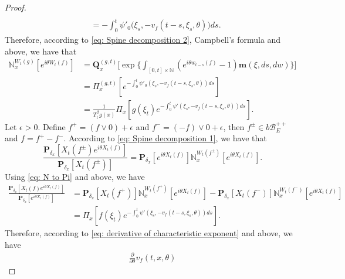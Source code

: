 \documentclass[12pt, a4paper]{amsart}
\theoremstyle{definition}
\numberwithin{equation}{section}
\begin{document}
\begin{proof}
\begin{align}
    \\&= -\int_0^t \psi'_0 \big(\xi_s, -v_f(t-s,\xi_s,\theta)\big)ds.
\end{align}
	Therefore, according to \eqref{eq: Spine decomposition 2}, Campbell's formula and above, we have that
\begin{align}
\label{eq: N to Pi}
	\mathbb N_x^{W_t(g)}[e^{i\theta W_t(f)}]
	&=\mathbf Q_x^{(g,t)} \Big[\exp\Big\{\int_{[0,t]\times \mathbb N}(e^{i\theta w_{t-s}(f)} - 1) \mathbf m(\xi, ds,dw)\Big\}\Big]
    \\&= \Pi_x^{(g,t)} [e^{-\int_0^t \psi'_0(\xi_s, -v_f(t-s,\xi_s,\theta))ds}]
    \\&= \frac{1}{T_t^\beta g (x)} \Pi_x[ g(\xi_t) e^{-\int_0^t \psi'(\xi_s, -v_f(t-s,\xi_s,\theta))ds} ].
\end{align}
    Let $\epsilon >0$.
    Define $f^+ = (f \vee 0) + \epsilon$ and $f^- = (-f) \vee 0 + \epsilon$, then $f^\pm \in b\mathscr B^{++}_E$ and $f = f^+ - f^-$.
    According to \eqref{eq: Spine decomposition 1}, we have that
\begin{equation}
    \frac{\mathbf P_{\delta_x}[X_t(f^{\pm})e^{i\theta X_t(f)}]}{\mathbf P_{\delta_x}[X_t(f^{\pm})]}
    = \mathbf P_{\delta_x}[e^{i\theta X_t(f)}] \mathbb N_x^{W_t(f^{\pm})}[e^{i\theta X_t(f)}].
\end{equation}
    Using \eqref{eq: N to Pi} and above, we have
\begin{align}
	\frac{\mathbf P_{\delta_x}[X_t(f)e^{i\theta X_t(f)}] }{\mathbf P_{\delta_x}[e^{i\theta X_t(f)}]}
	&= \mathbf P_{\delta_x}[X_t(f^+)] \mathbb N_x^{W_t(f^+)} [e^{i\theta X_t(f)}] - \mathbf P_{\delta_x}[X_t(f^-)]\mathbb N_x^{W_t(f^-)}[e^{i\theta X_t(f)}]
    \\& = \Pi_x[ f(\xi_t) e^{- \int_0^t \psi'(\xi_s, -v_f(t-s,\xi_s,\theta)) ds}  ].
\end{align}
	Therefore, according to \eqref{eq: derivative of characteristic exponent} and above, we have
\begin{align}
	\frac{\partial}{\partial \theta} v_f(t, x, \theta)

\end{align}
\end{proof}
\end{document}
